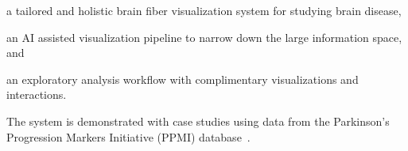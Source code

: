 \begin{compactitem}
	\item a tailored and holistic brain fiber visualization system for studying brain disease,
	\item an AI assisted visualization pipeline to narrow down the large information space, and
	\item an exploratory analysis workflow with complimentary visualizations and interactions.
\end{compactitem}

The system is demonstrated with 
case studies using data from 
the Parkinson's Progression Markers Initiative (PPMI) database~\cite{marek2011parkinson}.

%

